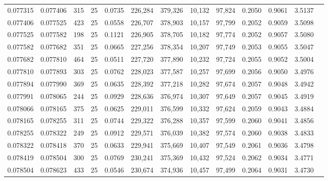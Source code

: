 \begin{tabular}{rrrrrrrrrrrrr}
0.077315 & 0.077406 &   315 &  25 &                                     0.0735 & 226,284 & 379,326 &  10,132 &  97,824 & 0.2050 & 0.9061 & 3.5137 \\
0.077406 & 0.077525 &   423 &  25 &                                     0.0558 & 226,707 & 378,903 &  10,157 &  97,799 & 0.2052 & 0.9059 & 3.5098 \\
0.077525 & 0.077582 &   198 &  25 &                                     0.1121 & 226,905 & 378,705 &  10,182 &  97,774 & 0.2052 & 0.9057 & 3.5080 \\
0.077582 & 0.077682 &   351 &  25 &                                     0.0665 & 227,256 & 378,354 &  10,207 &  97,749 & 0.2053 & 0.9055 & 3.5047 \\
0.077682 & 0.077810 &   464 &  25 &                                     0.0511 & 227,720 & 377,890 &  10,232 &  97,724 & 0.2055 & 0.9052 & 3.5004 \\
0.077810 & 0.077893 &   303 &  25 &                                     0.0762 & 228,023 & 377,587 &  10,257 &  97,699 & 0.2056 & 0.9050 & 3.4976 \\
0.077894 & 0.077990 &   369 &  25 &                                     0.0635 & 228,392 & 377,218 &  10,282 &  97,674 & 0.2057 & 0.9048 & 3.4942 \\
0.077991 & 0.078065 &   244 &  25 &                                     0.0929 & 228,636 & 376,974 &  10,307 &  97,649 & 0.2057 & 0.9045 & 3.4919 \\
0.078066 & 0.078165 &   375 &  25 &                                     0.0625 & 229,011 & 376,599 &  10,332 &  97,624 & 0.2059 & 0.9043 & 3.4884 \\
0.078165 & 0.078255 &   311 &  25 &                                     0.0744 & 229,322 & 376,288 &  10,357 &  97,599 & 0.2060 & 0.9041 & 3.4856 \\
0.078255 & 0.078322 &   249 &  25 &                                     0.0912 & 229,571 & 376,039 &  10,382 &  97,574 & 0.2060 & 0.9038 & 3.4833 \\
0.078322 & 0.078418 &   370 &  25 &                                     0.0633 & 229,941 & 375,669 &  10,407 &  97,549 & 0.2061 & 0.9036 & 3.4798 \\
0.078419 & 0.078504 &   300 &  25 &                                     0.0769 & 230,241 & 375,369 &  10,432 &  97,524 & 0.2062 & 0.9034 & 3.4771 \\
0.078504 & 0.078623 &   433 &  25 &                                     0.0546 & 230,674 & 374,936 &  10,457 &  97,499 & 0.2064 & 0.9031 & 3.4730 \\

\end{tabular}

